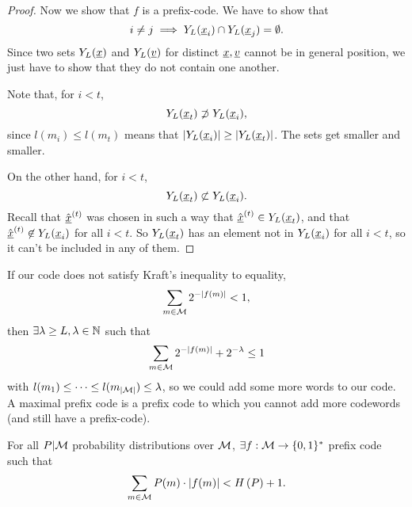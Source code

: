 \begin{proof}
	Now we show that $f$ is a prefix-code.
	We have to show that
	\begin{equation*}
		i \neq j \implies Y_L(\underline{x}_i) \cap Y_L(\underline{x}_j) = \emptyset.
	\end{equation*}
	Since two sets $Y_L(\underline{x})$ and $Y_L(\underline{v})$ for distinct $\underline{x}, \underline{v}$ cannot be in general position, we just have to show that they do not contain one another.

	Note that, for $i < t$,
	\begin{equation*}
		Y_L(\underline{x}_t) \not\supset Y_L(\underline{x}_i),
	\end{equation*}
	since $l(m_i) \le l(m_t)$ means that $\left|{Y_L(\underline{x}_i)}\right| \ge \left|{Y_L(\underline{x}_t)}\right|$.
	The sets get smaller and smaller.

	On the other hand, for $i < t$,
	\begin{equation*}
		Y_L(\underline{x}_t) \not\subset Y_L(\underline{x}_i).
	\end{equation*}
	Recall that $\hat{\underline{x}}^{(t)}$ was chosen in such a way that $\hat{\underline{x}}^{(t)} \in Y_L(\underline{x}_t)$, and that $\hat{\underline{x}}^{(t)} \not\in Y_L(\underline{x}_i)$ for all $i < t$.
	So $Y_L(\underline{x}_t)$ has an element not in $Y_L(\underline{x}_i)$ for all $i < t$, so it can't be included in any of them.
\end{proof}

If our code does not satisfy Kraft's inequality to equality, \ie
\begin{equation*}
	\sum_{m \in \mathcal{M}} 2^{-\left|{f(m)}\right|} < 1,
\end{equation*}
then $\exists \lambda \ge L, \lambda \in \mathbb{N}$  such that
\begin{equation*}
	\sum_{m \in \mathcal{M}} 2^{-\left|{f(m)}\right|} + 2^{-\lambda} \le 1
\end{equation*}
with $l(m_1) \le \dots \le l(m_{\left|{\mathcal{M}}\right|}) \le \lambda$, so we could add some more words to our code.
A maximal prefix code is a prefix code to which you cannot add more codewords (and still have a prefix-code).

\begin{prop} \label{prop:prefix-entropy-lower}
	For all $P|\mathcal{M}$ probability distributions over $\mathcal{M}$, $\exists f : \mathcal{M} \to \{0, 1\}^*$ prefix code such that
	\begin{equation*}
		\sum_{m \in \mathcal{M}} P(m) \cdot \left|{f(m)}\right| < H\left({P}\right) + 1.
	\end{equation*}
\end{prop}

